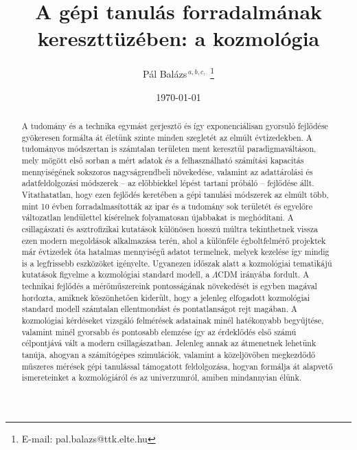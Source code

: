 \documentclass[12pt, a4paper]{article}
\title{A gépi tanulás forradalmának kereszttüzében: a kozmológia}
\author{Pál Balázs$^{\,a,b,c,}$%
	\thanks{E-mail: pal.balazs@ttk.elte.hu}%
}
\affil{%
	$^{a}$Eötvös Loránd Tudományegyetem, Komplex Rendszerek Fizikája Tanszék \\
	$^{b}$Wigner Fizikai Kutatóközpont, Nehézion-fizikai Kutatócsoport \\
	$^{c}$Planetology.hu, \url{https://planetology.hu/}
}
\date{\today}
\begin{document}
\maketitle

\begin{abstract}
	A tudomány és a technika egymást gerjesztő és így exponenciálisan gyorsuló fejlődése gyökeresen formálta át életünk szinte minden szegletét az elmúlt évtizedekben. A tudományos módszertan is számtalan területen ment keresztül paradigmaváltáson, mely mögött első sorban a mért adatok és a felhasználható számítási kapacitás mennyiségének sokszoros nagyságrendbeli növekedése, valamint az adattárolási és adatfeldolgozási módszerek -- az előbbiekkel lépést tartani próbáló -- fejlődése állt. Vitathatatlan, hogy ezen fejlődés keretében a gépi tanulási módszerek az elmúlt több, mint 10 évben forradalmasították az ipar és a tudomány sok területét és egyelőre változatlan lendülettel kísérelnek folyamatosan újabbakat is meghódítani. A csillagászati és asztrofizikai kutatások különösen hosszú múltra tekinthetnek vissza ezen modern megoldások alkalmazása terén, ahol a különféle égboltfelmérő projektek már évtizedek óta hatalmas mennyiségű adatot termelnek, melyek kezelése így mindig is a legfrissebb eszközöket igényelte. Ugyanezen időszak alatt a kozmológiai tematikájú kutatások figyelme a kozmológiai standard modell, a $\Lambda$CDM irányába fordult. A technikai fejlődés a mérőműszereink pontosságának növekedését is egyben magával hordozta, amiknek köszönhetően kiderült, hogy a jelenleg elfogadott kozmológiai standard modell számtalan ellentmondást és pontatlanságot rejt magában. A kozmológiai kérdéseket vizsgáló felmérések adatainak minél hatékonyabb begyűjtése, valamint minél gyorsabb és pontosabb elemzése így az érdeklődés első számú célpontjává vált a modern csillagászatban. Jelenleg annak az átmenetnek lehetünk tanúja, ahogyan a számítógépes szimulációk, valamint a közeljövőben megkezdődő műszeres mérések gépi tanulással támogatott feldolgozása, hogyan formálja át alapvető ismereteinket a kozmológiáról és az univerzumról, amiben mindannyian élünk.
\end{abstract}
\end{document}
